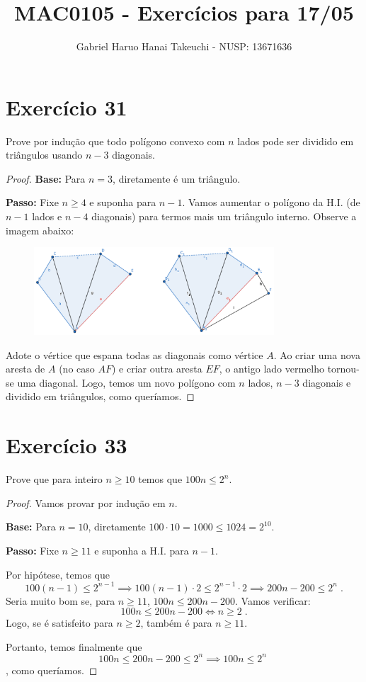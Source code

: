 \documentclass{article}
\author{Gabriel Haruo Hanai Takeuchi - NUSP: 13671636}
\title{MAC0105 - Exercícios para 17/05}
\date{}
\begin{document}
\maketitle

\section*{Exercício 31}
Prove por indução que todo polígono convexo com $n$ lados pode ser dividido em triângulos usando $n-3$ diagonais.

\begin{proof}
\textbf{Base: } Para $n=3$, diretamente é um triângulo.

\textbf{Passo: } Fixe $n \geq 4$ e suponha para $n-1$.
Vamos aumentar o polígono da H.I. (de $n-1$ lados e $n-4$ diagonais) para termos mais um triângulo interno.
Observe a imagem abaixo:
\begin{figure}[h]
    \centering
    \includegraphics[width=0.8\textwidth]{triangulos.png}
\end{figure}

Adote o vértice que espana todas as diagonais como vértice $A$.
Ao criar uma nova aresta de $A$ (no caso $AF$) e criar outra aresta $EF$, o antigo lado vermelho tornou-se uma diagonal.
Logo, temos um novo polígono com $n$ lados, $n-3$ diagonais e dividido em triângulos, como queríamos.

\end{proof}

\section*{Exercício 33}
Prove que para inteiro $n \geq 10$ temos que $100n \leq 2^n$.
\begin{proof}
Vamos provar por indução em $n$.

\textbf{Base: } Para $n=10$, diretamente $100\cdot 10 = 1000 \leq 1024 = 2^{10}$.

\textbf{Passo: } Fixe $n \geq 11$ e suponha a H.I. para $n-1$.

Por hipótese, temos que 
\[
    100(n-1) \leq 2^{n-1} \implies 100(n-1) \cdot 2 \leq 2^{n-1} \cdot 2
    \implies 200n - 200 \leq 2^n \; .
\]
Seria muito bom se, para $n \geq 11$, $100n \leq 200n - 200$. Vamos verificar:
\[
    100n \leq 200n - 200 \iff n \geq 2 \; .
\]
Logo, se é satisfeito para $n \geq 2$, também é para $n \geq 11$.

Portanto, temos finalmente que 
\[
    100n \leq 200n - 200 \leq 2^n \implies 100n \leq 2^n \;
\]
, como queríamos.
\end{proof}
\end{document}
